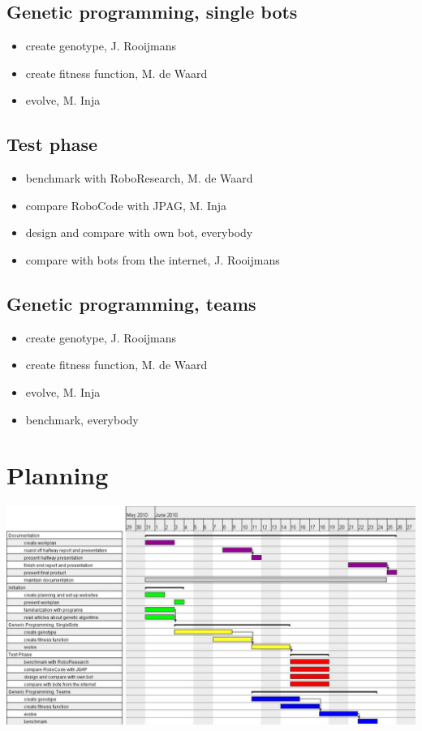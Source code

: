 \documentclass[a4paper,10pt]{article}
\begin{document}
\subsection{Genetic programming, single bots}
\begin{itemize}
\item create genotype, J. Rooijmans
\item create fitness function, M. de Waard
\item evolve, M. Inja
\end{itemize}

\subsection{Test phase}
\begin{itemize}
\item benchmark with RoboResearch, M. de Waard
\item compare RoboCode with JPAG, M. Inja
\item design and compare with own bot, everybody
\item compare with bots from the internet, J. Rooijmans
\end{itemize}

\subsection{Genetic programming, teams}
\begin{itemize}
\item create genotype, J. Rooijmans
\item create fitness function, M. de Waard
\item evolve, M. Inja
\item benchmark, everybody
\end{itemize}
\newpage


\newpage
\appendix
\section{Planning}
\label{planning}
\includegraphics[height=0.75\textwidth, angle=-90]{planning.png}
\end{document}
